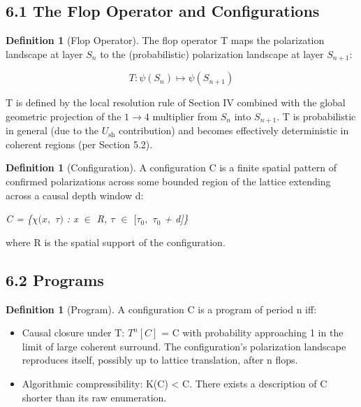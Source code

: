 \documentclass[11pt,oneside]{report}
\theoremstyle{definition}
\newtheorem{definition}[theorem]{Definition}
\theoremstyle{remark}
\begin{document}
\subsection*{6.1 The Flop Operator and Configurations}

\begin{definition}[Flop Operator]
The flop operator T maps the polarization
landscape at layer \ensuremath{S_{n}} to the (probabilistic) polarization landscape at
layer \ensuremath{S_{n+1}:}
\end{definition}

\begin{equation*}
T: \psi (S_{n}) \mapsto \psi (S_{n+1})
\end{equation*}

T is defined by the local resolution rule of Section IV combined with
the global geometric projection of the \ensuremath{1\to 4} multiplier from \ensuremath{S_{n}} into \ensuremath{S_{n+1}.}
T is probabilistic in general (due to the \ensuremath{U_{\mathrm{sh}}} contribution) and becomes
effectively deterministic in coherent regions (per Section 5.2).

\begin{definition}[Configuration]
A configuration C is a finite spatial
pattern of confirmed polarizations across some bounded region of the
lattice extending across a causal depth window d:
\end{definition}

\emph{C = \{\ensuremath{\chi (x,} \ensuremath{\tau )} : x \ensuremath{\in} R, \ensuremath{\tau} \ensuremath{\in} \ensuremath{[\tau_{0},} \ensuremath{\tau_{0}} + d]\}}

where R is the spatial support of the configuration.

\subsection*{6.2 Programs}

\begin{definition}[Program]
A configuration C is a program of period n iff:
\end{definition}

\begin{itemize}
\item
  Causal closure under T: \ensuremath{T^{n}[C]} = C with probability approaching
  1 in the limit of large coherent surround. The configuration's
  polarization landscape reproduces itself, possibly up to lattice
  translation, after n flops.
\item
  Algorithmic compressibility: K(C) \textless{} \textbar C\textbar.
  There exists a description of C shorter than its raw enumeration.
\end{itemize}
\end{document}
